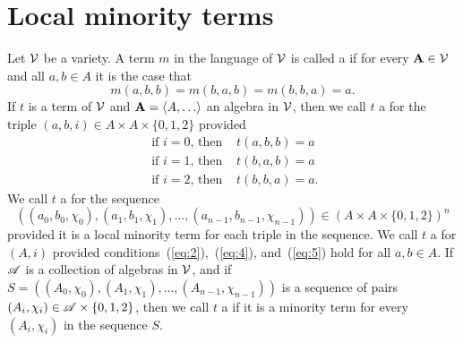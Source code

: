 













































\section{Local minority terms}
Let $\mathcal{V}$ be a variety.  A term $m$ in the language of $\mathcal{V}$
is called a  if for every $\mathbf{A} \in \mathcal{V}$ and
all $a, b \in A$ it is the case that 
\[
m(a,b,b) =m(b,a,b) = m(b,b,a) = a.
\]
If $t$ is a term of $\mathcal{V}$ and $\bA = \<A, \dots\>$ an algebra in $\mathcal{V}$, 
then we call $t$ a  for the triple
$(a,b,i) \in A\times A \times \{0,1,2\}$ provided
\begin{align}
\text{ if $i=0$, then } & t(a, b, b)= a\label{eq:2}\\
\text{ if $i=1$, then } & t(b,a,b) = a\label{eq:4}\\
\text{ if $i=2$, then } & t(b,b,a) = a\label{eq:5}. 
\end{align}
We call $t$ a
 for the sequence
\[
((a_0, b_0, \chi_0), (a_1, b_1, \chi_1), \dots, (a_{n-1}, b_{n-1}, \chi_{n-1}))
\in (A\times A \times \{0,1,2\})^n\]
provided it is a local minority term for each triple in the sequence.
We call $t$ a  for 
$(A,i)$ provided conditions~(\ref{eq:2}),~(\ref{eq:4}), and~(\ref{eq:5}) hold
for all $a, b \in A$.
If $\mathscr{A}$ is a collection of algebras in $\mathcal{V}$, and if
$S = ((A_0, \chi_0), (A_1, \chi_1), \dots, (A_{n-1}, \chi_{n-1}))$
is a sequence of pairs $(A_i, \chi_i) \in \mathscr{A} \times \{0,1,2\}$, then
we call $t$ a  if it is a
\glocal minority term for every $(A_i, \chi_i)$ in the sequence
$S$.

